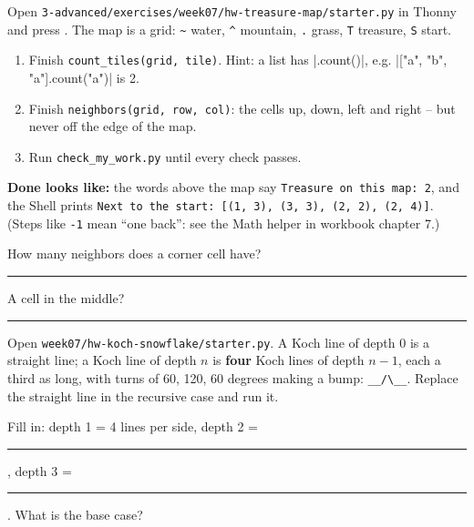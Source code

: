 \namedateline

\begin{core}
Open \texttt{3-advanced/exercises/week07/hw-treasure-map/starter.py} in Thonny and press . The map is a grid:
\texttt{\textasciitilde} water, \texttt{\textasciicircum} mountain, \texttt{.} grass, \texttt{T} treasure, \texttt{S} start.
\begin{enumerate}[itemsep=1pt]
  \item Finish \texttt{count\_tiles(grid, tile)}. Hint: a list has \py|.count()|, e.g. \py|["a", "b", "a"].count("a")| is 2.
  \item Finish \texttt{neighbors(grid, row, col)}: the cells up, down, left and right -- but never off the edge of the map.
  \item Run \texttt{check\_my\_work.py} until every check passes.
\end{enumerate}
\textbf{Done looks like:} the words above the map say \texttt{Treasure on this map: 2}, and the Shell prints \texttt{Next to the start: [(1, 3), (3, 3), (2, 2), (2, 4)]}. (Steps like \texttt{-1} mean \enquote{one back}: see the Math helper in workbook chapter 7.)

How many neighbors does a corner cell have? \rule{1.5cm}{0.4pt} \quad A cell in the middle? \rule{1.5cm}{0.4pt}
\end{core}

\begin{challenge}
Open \texttt{week07/hw-koch-snowflake/starter.py}. A Koch line of depth 0 is a straight line; a Koch line of depth $n$ is \textbf{four} Koch lines of depth $n-1$, each a third as long, with turns of 60, 120, 60 degrees making a bump: \texttt{\_\_/\textbackslash\_\_}. Replace the straight line in the recursive case and run it.

Fill in: depth 1 = 4 lines per side, depth 2 = \rule{1cm}{0.4pt}, depth 3 = \rule{1cm}{0.4pt}. What is the base case? 
\end{challenge}

